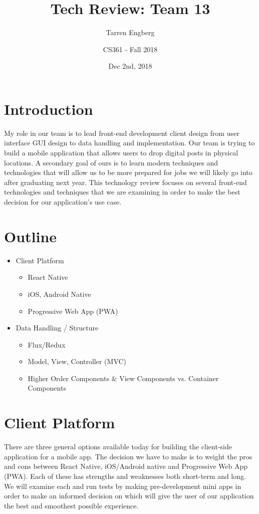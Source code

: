 \documentclass[titlepage,onecolumn]{article}
\title{Tech Review: Team 13}
\author{
  Tarren Engberg
  \and CS361 - Fall 2018
}
\date{Dec 2nd, 2018}
\begin{document}
  \maketitle

  \section{Introduction}
My role in our team is to lead front-end development client design from user interface GUI design to data handling and implementation. Our team is trying to build a mobile application that allows users to drop digital posts in physical locations. A secondary goal of ours is to learn modern techniques and technologies that will allow us to be more prepared for jobs we will likely go into after graduating next year. This technology review focuses on several front-end technologies and techniques that we are examining in order to make the best decision for our application's use case.

\section{Outline}
\begin{itemize}
    \item Client Platform
        \begin{itemize}
            \item React Native
            \item iOS, Android Native
            \item Progressive Web App (PWA)
        \end{itemize}
    \item Data Handling / Structure
        \begin{itemize}
            \item Flux/Redux
            \item Model, View, Controller (MVC)
            \item Higher Order Components \& View Components vs. Container Components
        \end{itemize}
    
\end{itemize}

\section{Client Platform}
There are three general options available today for building the client-side application for a mobile app. The decision we have to make is to weight the pros and cons between React Native, iOS/Android native and Progressive Web App (PWA). Each of these has strengths and weaknesses both short-term and long. We will examine each and run tests by making pre-development mini apps in order to make an informed decision on which will give the user of our application the best and smoothest possible experience.
\end{document}
